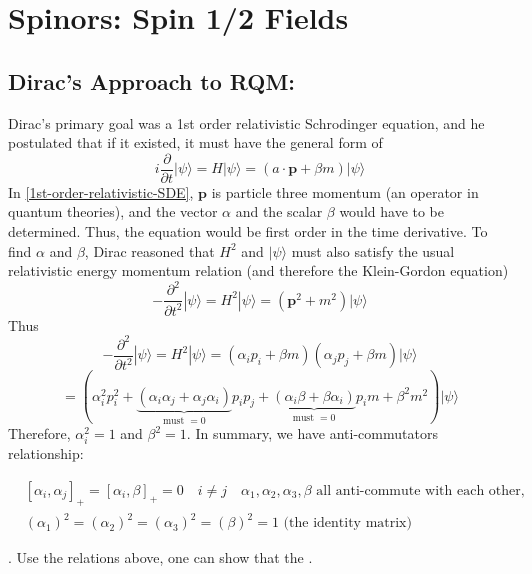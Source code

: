 \chapter{Spinors: Spin 1/2 Fields}
\section{Dirac's Approach to RQM:}
Dirac's primary goal was a 1st order relativistic Schrodinger equation, and he postulated that if it existed, it must have the general form of 
\begin{equation}
i \frac{\partial}{\partial t}|\psi\rangle= H|\psi\rangle=(a \cdot \mathbf{p}+\beta m)|\psi\rangle
\label{1st-order-relativistic-SDE}
\end{equation}
In \ref{1st-order-relativistic-SDE}, $\mathbf{p}$ is particle three momentum (an operator in quantum theories), and the vector $\alpha$ and the scalar $\beta$ would have to be determined. Thus, the equation would be first order in the time derivative. To find $\alpha$ and $\beta$, Dirac reasoned that $H^{2}$ and $|\psi\rangle$ must also satisfy the usual relativistic energy momentum relation (and therefore the Klein-Gordon equation)
$$
-\frac{\partial^{2}}{\partial t^{2}}|\psi\rangle= H^{2}|\psi\rangle=\left(\mathbf{p}^{2}+m^{2}\right)|\psi\rangle
$$
Thus
$$
-\frac{\partial^{2}}{\partial t^{2}}|\psi\rangle= H^{2}|\psi\rangle=\left(\alpha_{i} p_{i}+\beta m\right)\left(\alpha_{j} p_{j}+\beta m\right)|\psi\rangle
$$
$$
=\left(\alpha_{i}^{2} p_{i}^{2}+\underbrace{\left(\alpha_{i} \alpha_{j}+\alpha_{j} \alpha_{i}\right)}_{\text {must }=0}p_{i}p_{j}+\underbrace{\left(\alpha_{i} \beta+\beta \alpha_{i}\right)}_{\text {must }=0} p_{i} m+\beta^{2} m^{2}\right)|\psi\rangle
$$
Therefore, $\alpha_{i}^{2}=1$ and $\beta^{2}=1$. In summary, we have anti-commutators relationship:
\begin{qt}
    \begin{equation}
\begin{aligned}
&\left[\alpha_{i}, \alpha_{j}\right]_{+}=\left[\alpha_{i}, \beta\right]_{+}=0 \quad i \neq j \quad \alpha_{1}, \alpha_{2}, \alpha_{3}, \beta \text { all anti-commute with each other, }\\
&\left(\alpha_{1}\right)^{2}=\left(\alpha_{2}\right)^{2}=\left(\alpha_{3}\right)^{2}=(\beta)^{2}=1 \text { (the identity matrix) }
\end{aligned}
\label{standard-condition}
\end{equation}
\end{qt}
. Use the relations above, one can show that the .

